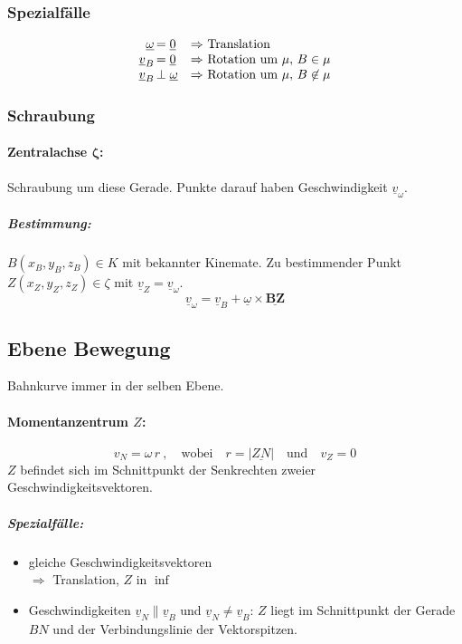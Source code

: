 \documentclass{article}
\begin{document}
\begin{multicols*}{4}
				\subsubsection{Spezialfälle} %
					\[
						\begin{array}{r@{\,}l@{\quad\Rightarrow\ }l}
							\underline{\omega} &= \underline{0} & \text{Translation} \\
							\underline{v}_B &= \underline{0} & \text{Rotation um } \mu,\, B \in \mu \\
							\underline{v}_B &\perp \underline{\omega} & \text{Rotation um } \mu,\, B \not\in \mu
						\end{array}
					\]
				\subsubsection{Schraubung} %
					\paragraph{Zentralachse $\mathbf{\zeta}$:} %
						Schraubung um diese Gerade. Punkte darauf haben Geschwindigkeit
						$\underline{v}_{\omega}.$
						\subparagraph{Bestimmung:} %
							$B(x_B, y_B, z_B) \in K$ mit bekannter Kinemate. Zu bestimmender
							Punkt $Z(x_Z,y_Z,z_Z) \in \zeta$ mit
							$\underline{v}_Z = \underline{v}_{\omega}$.
							\[
								\underline{v}_{\omega} = \underline{v}_B + \underline{\omega} \times \mathbf{\underline{BZ}}
							\]
			\subsection{Ebene Bewegung} %
				Bahnkurve immer in der selben Ebene.
				\paragraph{Momentanzentrum $Z$:} %
					\[
						v_N = \omega \, r \ , \quad
						\text{wobei} \quad r = |\underline{ZN}| \quad
						\text{und} \quad v_Z = 0
					\]
					$Z$ befindet sich im Schnittpunkt der Senkrechten zweier
					Geschwindigkeitsvektoren.

					\subparagraph{Spezialfälle:} %
						\begin{itemize}
							\item gleiche Geschwindigkeitsvektoren \\
							$\Rightarrow$ Translation, $Z$ in $\inf$
							\item Geschwindigkeiten
							$\underline{v}_N \parallel \underline{v}_B$ und
							$\underline{v}_N \neq \underline{v}_B$: $Z$ liegt im
							Schnittpunkt der Gerade $BN$ und der Verbindungslinie der
							Vektorspitzen.
							

\end{itemize}
\end{multicols*}
\end{document}
